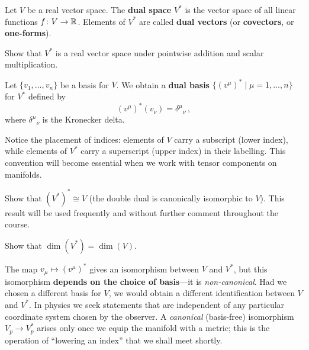 \begin{definition}\label{def:dual-space}
  Let $V$ be a real vector space.  The \textbf{dual space} $V^*$ is
  the vector space of all linear functions $f\colon V\to\mathbb{R}$.
  Elements of $V^*$ are called \textbf{dual vectors} (or
  \textbf{covectors}, or \textbf{one-forms}).
\end{definition}

\begin{exercise}\label{ex:dual-vs}
  Show that $V^*$ is a real vector space under pointwise addition
  and scalar multiplication.
\end{exercise}

\begin{remark}
  Let $\{v_1,\dots,v_n\}$ be a basis for $V$.  We obtain a
  \textbf{dual basis} $\{(v^\mu)^* \mid \mu=1,\dots,n\}$ for
  $V^*$ defined by
  \begin{equation}\label{eq:dual-basis}
    (v^\mu)^*(v_\nu) = \delta^\mu{}_\nu\,,
  \end{equation}
  where $\delta^\mu{}_\nu$ is the Kronecker delta.
\end{remark}

\noindent
Notice the placement of indices: elements of $V$ carry a subscript
(lower index), while elements of $V^*$ carry a superscript (upper
index) in their labelling.  This convention will become essential
when we work with tensor components on manifolds.

\begin{exercise}\label{ex:double-dual}
  Show that $(V^*)^* \cong V$ (the double dual is canonically
  isomorphic to $V$).  This result will be used frequently and
  without further comment throughout the course.
\end{exercise}

\begin{exercise}\label{ex:dim-dual}
  Show that $\dim(V^*) = \dim(V)$.
\end{exercise}

\begin{remark}
  The map $v_\mu \mapsto (v^\mu)^*$ gives an isomorphism between
  $V$ and $V^*$, but this isomorphism \textbf{depends on the choice
  of basis}---it is \emph{non-canonical}.  Had we chosen a
  different basis for $V$, we would obtain a different
  identification between $V$ and $V^*$.  In physics we seek
  statements that are independent of any particular coordinate
  system chosen by the observer.  A \emph{canonical} (basis-free)
  isomorphism $V_p \to V_p^*$ arises only once we equip the
  manifold with a metric; this is the operation of ``lowering an
  index'' that we shall meet shortly.
\end{remark}

